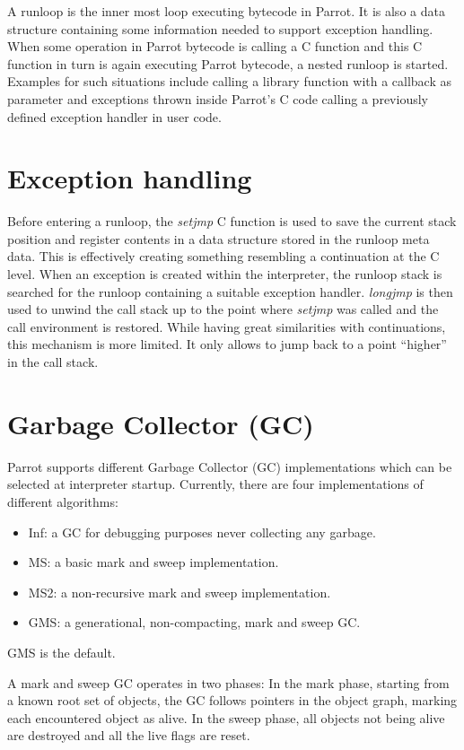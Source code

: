 \documentclass[bachelor,english]{hgbthesis}
\begin{document}
A runloop is the inner most loop executing bytecode in Parrot. It is also a data structure containing some information needed to support exception handling. When some operation in Parrot bytecode is calling a C function and this C function in turn is again executing Parrot bytecode, a nested runloop is started. Examples for such situations include calling a library function with a callback as parameter and exceptions thrown inside Parrot's C code calling a previously defined exception handler in user code.

\section{Exception handling}

Before entering a runloop, the \textit{setjmp} C function is used to save the current stack position and register contents in a data structure stored in the runloop meta data. This is effectively creating something resembling a continuation at the C level. When an exception is created within the interpreter, the runloop stack is searched for the runloop containing a suitable exception handler. \textit{longjmp} is then used to unwind the call stack up to the point where \textit{setjmp} was called and the call environment is restored. While having great similarities with continuations, this mechanism is more limited. It only allows to jump back to a point ``higher'' in the call stack.

\section{Garbage Collector (GC)}

Parrot supports different Garbage Collector (GC) implementations which can be selected at interpreter startup. Currently, there are four implementations of different algorithms:
\begin{itemize}
\item Inf: a GC for debugging purposes never collecting any garbage.
\item MS: a basic mark and sweep implementation.
\item MS2: a non-recursive mark and sweep implementation.
\item GMS: a generational, non-compacting, mark and sweep GC.
\end{itemize}
GMS is the default.

A mark and sweep GC operates in two phases: In the mark phase, starting from a known root set of objects, the GC follows pointers in the object graph, marking each encountered object as alive. In the sweep phase, all objects not being alive are destroyed and all the live flags are reset.
\end{document}
